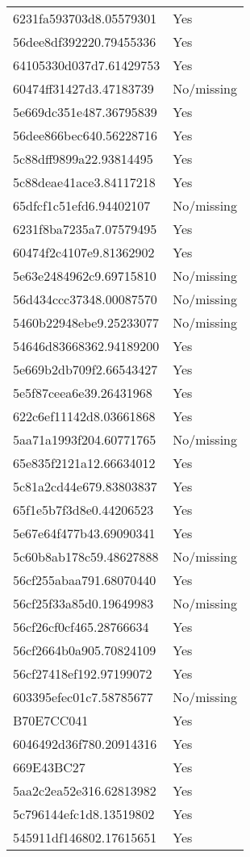 \begin{tabular}{ll}
6231fa593703d8.05579301 & Yes \\
56dee8df392220.79455336 & Yes \\
64105330d037d7.61429753 & Yes \\
60474ff31427d3.47183739 & No/missing \\
5e669dc351e487.36795839 & Yes \\
56dee866bec640.56228716 & Yes \\
5c88dff9899a22.93814495 & Yes \\
5c88deae41ace3.84117218 & Yes \\
65dfcf1c51efd6.94402107 & No/missing \\
6231f8ba7235a7.07579495 & Yes \\
60474f2c4107e9.81362902 & Yes \\
5e63e2484962c9.69715810 & No/missing \\
56d434ccc37348.00087570 & No/missing \\
5460b22948ebe9.25233077 & No/missing \\
54646d83668362.94189200 & Yes \\
5e669b2db709f2.66543427 & Yes \\
5e5f87ceea6e39.26431968 & Yes \\
622c6ef11142d8.03661868 & Yes \\
5aa71a1993f204.60771765 & No/missing \\
65e835f2121a12.66634012 & Yes \\
5c81a2cd44e679.83803837 & Yes \\
65f1e5b7f3d8e0.44206523 & Yes \\
5e67e64f477b43.69090341 & Yes \\
5c60b8ab178c59.48627888 & No/missing \\
56cf255abaa791.68070440 & Yes \\
56cf25f33a85d0.19649983 & No/missing \\
56cf26cf0cf465.28766634 & Yes \\
56cf2664b0a905.70824109 & Yes \\
56cf27418ef192.97199072 & Yes \\
603395efec01c7.58785677 & No/missing \\
B70E7CC041 & Yes \\
6046492d36f780.20914316 & Yes \\
669E43BC27 & Yes \\
5aa2c2ea52e316.62813982 & Yes \\
5c796144efc1d8.13519802 & Yes \\
545911df146802.17615651 & Yes \\

\end{tabular}

